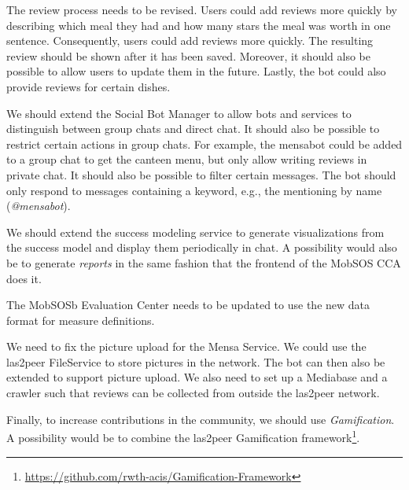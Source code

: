 The review process needs to be revised. Users could add reviews more quickly by describing which meal they had and how many stars the meal was worth in one sentence. Consequently, users could add reviews more quickly. The resulting review should be shown after it has been saved. Moreover, it should also be possible to allow users to update them in the future. Lastly, the bot could also provide reviews for certain dishes.

We should extend the Social Bot Manager to allow bots and services to distinguish between group chats and direct chat. It should also be possible to restrict certain actions in group chats. For example, the mensabot could be added to a group chat to get the canteen menu, but only allow writing reviews in private chat.
It should also be possible to filter certain messages. The bot should only respond to messages containing a keyword, e.g., the mentioning by name (\emph{@mensabot}).

We should extend the success modeling service to generate visualizations from the success model and display them periodically in chat. A possibility would also be to generate \emph{reports} in the same fashion that the frontend of the MobSOS CCA does it. 

The MobSOSb Evaluation Center needs to be updated to use the new data format for measure definitions.

We need to fix the picture upload for the Mensa Service. We could use the las2peer FileService to store pictures in the network. The bot can then also be extended to support picture upload. 
We also need to set up a Mediabase and a crawler such that reviews can be collected from outside the las2peer network. 

Finally, to increase contributions in the community, we should use \emph{Gamification}. A possibility would be to combine the las2peer Gamification framework\footnote{\url{https://github.com/rwth-acis/Gamification-Framework}}.